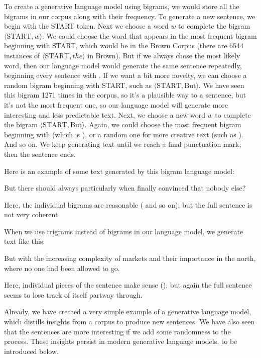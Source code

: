 To create a generative language model using bigrams, we would store all the bigrams in our corpus along with their frequency.  To generate a new sentence, we begin with the START token.  Next we choose a word $w$ to complete the bigram $\langle \text{START}, w\rangle$.  We could choose the word that appears in the most frequent bigram beginning with START, which would be  in the Brown Corpus (there are 6544 instances of $\langle \text{START}, the\rangle$ in Brown).  But if we always chose the most likely word, then our language model would generate the same sentence repeatedly, beginning every sentence with .  If we want a bit more novelty, we can choose a random bigram beginning with START, such as $\langle \text{START}, \text{But}\rangle$.  We have seen this bigram 1271 times in the corpus, so it's a plausible way to a sentence, but it's not the most frequent one, so our language model will generate more interesting and less predictable text.  Next, we choose a new word $w$ to complete the bigram $\langle \text{START}, \text{But}\rangle$.  Again, we could choose the most frequent bigram beginning with  (which is ), or a random one for more creative text (such as ).  And so on.  We keep generating text until we reach a final punctuation mark; then the sentence ends.

Here is an example of some text generated by this bigram language model:

\ea But there should always particularly when finally convinced that nobody else?
\z 


Here, the individual bigrams are reasonable ( and so on), but the full sentence is not very coherent.


When we use trigrams instead of bigrams in our language model, we generate text like this:


\ea But with the increasing complexity of markets and their importance in the north, where no one had been allowed to go.  
\z 

Here, individual pieces of the sentence make sense (), but again the full sentence seems to lose track of itself partway through.

Already, we have created a very simple example of a generative language model, which distills insights from a corpus to produce new sentences.  We have also seen that the sentences are more interesting if we add some randomness to the process.  These insights persist in modern generative language models, to be introduced below.



